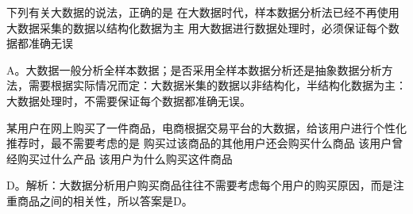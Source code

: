 \begin{groups}
\begin{questions}[rp]
\question
{}下列有关大数据的说法，正确的是
{在大数据时代，样本数据分析法已经不再使用}
{大数据采集的数据以结构化数据为主}
{用大数据进行数据处理时，必须保证每个数据都准确无误}
\begin{solution}
A。大数据一般分析全样本数据；是否采用全样本数据分析还是抽象数据分析方法，需要根据实际情况而定：大数据米集的数据以非结构化，半结构化数据为主：大数据处理时，不需要保证每个数据都准确无误。
\end{solution}

\question
{}某用户在网上购买了一件商品，电商根据交易平台的大数据，给该用户进行个性化推荐时，最不需要考虑的是
{购买过该商品的其他用户还会购买什么商品}
{该用户曾经购买过什么产品}
{该用户为什么购买这件商品}
\begin{solution}
D。解析：大数据分析用户购买商品往往不需要考虑每个用户的购买原因，而是注重商品之间的相关性，所以答案是D。
\end{solution}






\end{questions}
\end{groups}
